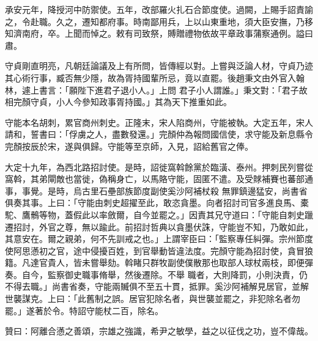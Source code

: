 \begin{pinyinscope}
 承安元年，降授河中防禦使。五年，改部羅火扎石合節度使。過闕，上賜手詔責諭之，令赴職。久之，遷知都府事。時南鄙用兵，上以山東重地，須大臣安撫，乃移知濟南府，卒。上聞而悼之。敕有司致祭，賻贈禮物依故平章政事蒲察通例。謚曰肅。



 守貞剛直明亮，凡朝廷論議及上有所問，皆傳經以對。上嘗與泛論人材，守貞乃迹其心術行事，臧否無少隱，故為胥持國輩所忌，竟以直罷。後趙秉文由外官入翰林，遽上書言：「願陛下進君子退小人。」上問
 君子小人謂誰。」秉文對：「君子故相完顏守貞，小人今參知政事胥持國。」其為天下推重如此。



 守能本名胡刺，累官商州刺史。正隆末，宋人陷商州，守能被執。大定五年，宋人請和，誓書曰：「俘虜之人，盡數發還。」完顏仲為報問國信使，求守能及新息縣令完顏按辰於宋，遂與俱歸。守能等至京師，入見，詔給舊官之俸。



 大定十九年，為西北路招討使。是時，詔徙窩斡餘黨於臨潢、泰州。押刺民列嘗從窩斡，其弟閘敵也當徙，偽稱身亡，以馬賂守能，固匿不遣。及受賕補賽也蕃部通事，事覺。是時，烏古里石壘部族節度副使奚沙阿補杖殺
 無罪鎮邊猛安，尚書省俱奏其事。上曰：「守能由刺史超擢至此，敢恣貪墨。向者招討司官多進良馬、橐駝、鷹鶻等物，蓋假此以率斂爾，自今並罷之。」因責其兄守道曰：「守能自刺史躐遷招討，外官之尊，無以踰此。前招討哲典以貪墨伏誅，守能豈不知，乃敢如此，其意安在。爾之親弟，何不先訓戒之也。」上謂宰臣曰：「監察專任糾彈。宗州節度使阿思懣初之官，途中侵擾百姓，到官舉動皆違法度。完顏守能為招討使，貪冒狼籍。凡達官貴人，皆未嘗舉劾。斡睹只群牧副使僕散那也取部人球杖兩枝，即便彈奏。自今，監察御史職事脩舉，然後遷除。不舉
 職者，大則降罰，小則決責，仍不得去職。」尚書省奏，守能兩贓俱不至五十貫，抵罪。奚沙阿補解見居官，並解世襲謀克。上曰：「此舊制之誤。居官犯除名者，與世襲並罷之，非犯除名者勿罷。」遂著於令。特詔守能杖二百，除名。



 贊曰：阿離合懣之善頌，宗雄之強識，希尹之敏學，益之以征伐之功，豈不偉哉。



\end{pinyinscope}